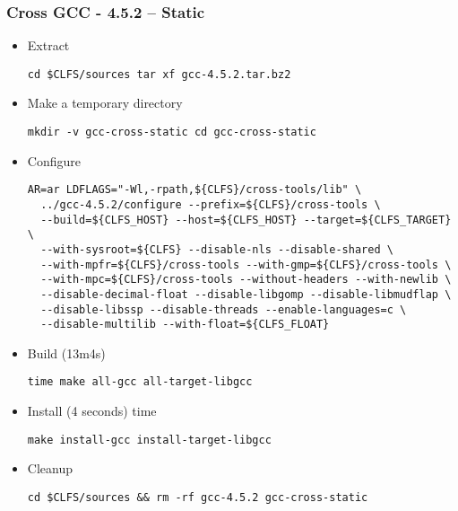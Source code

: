 \subsubsection{Cross GCC - 4.5.2 -- Static}
 \begin{itemize}
  \item Extract
    \begin{lstlisting}
cd $CLFS/sources tar xf gcc-4.5.2.tar.bz2
    \end{lstlisting}
  \item Make a temporary directory
    \begin{lstlisting}
mkdir -v gcc-cross-static cd gcc-cross-static
    \end{lstlisting}
  \item Configure
    \begin{lstlisting}
AR=ar LDFLAGS="-Wl,-rpath,${CLFS}/cross-tools/lib" \
  ../gcc-4.5.2/configure --prefix=${CLFS}/cross-tools \
  --build=${CLFS_HOST} --host=${CLFS_HOST} --target=${CLFS_TARGET} \
  --with-sysroot=${CLFS} --disable-nls --disable-shared \
  --with-mpfr=${CLFS}/cross-tools --with-gmp=${CLFS}/cross-tools \
  --with-mpc=${CLFS}/cross-tools --without-headers --with-newlib \
  --disable-decimal-float --disable-libgomp --disable-libmudflap \
  --disable-libssp --disable-threads --enable-languages=c \
  --disable-multilib --with-float=${CLFS_FLOAT}
    \end{lstlisting}
  \item  Build (13m4s)
    \begin{lstlisting}
time make all-gcc all-target-libgcc
    \end{lstlisting}
  \item Install (4 seconds) time
    \begin{lstlisting}
make install-gcc install-target-libgcc
    \end{lstlisting}
  \item Cleanup
    \begin{lstlisting}
cd $CLFS/sources && rm -rf gcc-4.5.2 gcc-cross-static
    \end{lstlisting}
\end{itemize}

